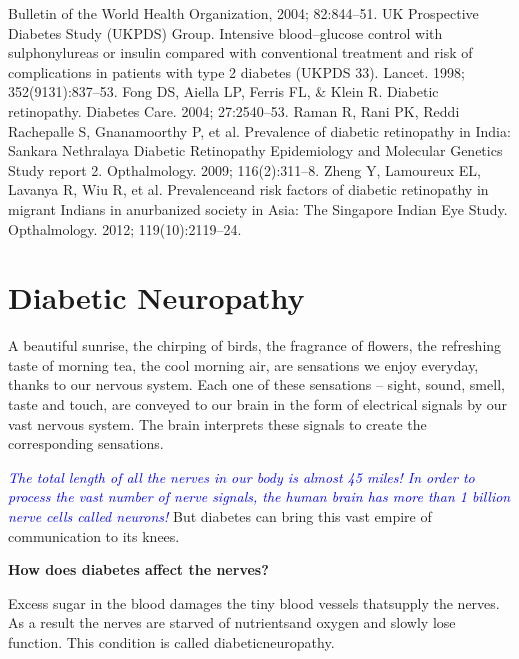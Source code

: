 \begin{thebibliography}{99}
 Bulletin of the World Health Organization, 2004; 82:844–51.
 UK Prospective Diabetes Study (UKPDS) Group. Intensive blood–glucose control with sulphonylureas or insulin compared with conventional treatment and risk of complications in patients with type 2 diabetes (UKPDS 33). Lancet. 1998; 352(9131):837–53.
 Fong DS, Aiella LP, Ferris FL, \& Klein R. Diabetic retinopathy. Diabetes Care. 2004; 27:2540–53.
 Raman R, Rani PK, Reddi Rachepalle S, Gnanamoorthy P, et al. Prevalence of diabetic retinopathy in India: Sankara Nethralaya Diabetic Retinopathy Epidemiology and Molecular Genetics Study report 2. Opthalmology. 2009; 116(2):311–8.
 Zheng Y, Lamoureux EL, Lavanya R, Wiu R, et al. Prevalence\break and risk factors of diabetic retinopathy in migrant Indians in an\break urbanized society in Asia: The Singapore Indian Eye Study. Opthalmo\-logy. 2012; 119(10):2119–24.
\end{thebibliography}

\newpage

\chapter{Diabetic Neuropathy}\label{chap16}

A beautiful sunrise, the chirping of birds, the fragrance of flowers, the refreshing taste of morning tea, the cool morning air, are sensations we enjoy everyday, thanks to our nervous system. Each one of these sensations – sight, sound, smell, taste and touch, are conveyed to our brain in the form of electrical signals by our vast nervous system. The brain interprets these signals to create the corresponding sensations.

\textcolor{blue}{\textit{The total length of all the nerves in our body is almost 45 miles! In order to process the vast number of nerve signals, the human brain has more than 1 billion nerve cells called neurons!}} But diabetes can bring this vast empire of communication to its knees.

\vskip 4pt
\noindent\textbf{How does diabetes affect the nerves?}
\vskip 4pt

Excess sugar in the blood damages the tiny blood vessels that\break supply the nerves. As a result the nerves are starved of nutrients\break and oxygen and slowly lose function. This condition is called diabetic\break neuropathy.


